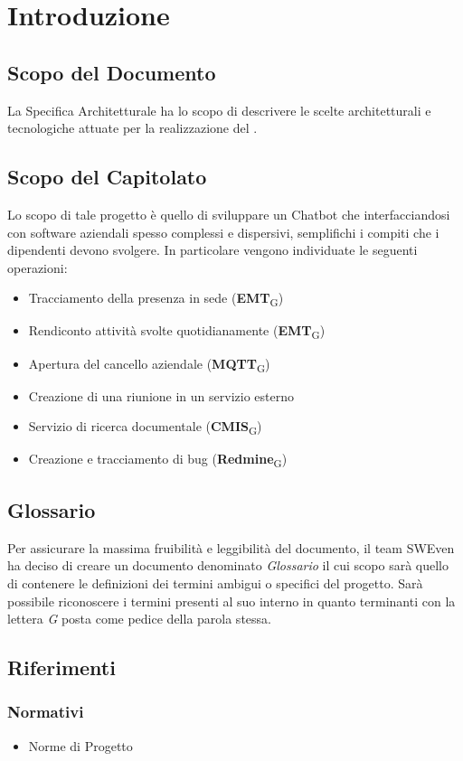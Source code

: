 \section{Introduzione}
\subsection{Scopo del Documento}
La Specifica Architetturale ha lo scopo di descrivere le scelte architetturali e tecnologiche attuate per la realizzazione del .

\subsection{Scopo del Capitolato}
Lo scopo di tale progetto è quello di sviluppare un Chatbot che interfacciandosi con software aziendali spesso complessi e dispersivi, semplifichi i compiti che i dipendenti devono svolgere. In particolare vengono individuate le seguenti operazioni: 
\begin{itemize}
	\item Tracciamento della presenza in sede (\textbf{EMT}\textsubscript{G})
	\item Rendiconto attività svolte quotidianamente (\textbf{EMT}\textsubscript{G})
	\item Apertura del cancello aziendale (\textbf{MQTT}\textsubscript{G})
	\item Creazione di una riunione in un servizio esterno
	\item Servizio di ricerca documentale (\textbf{CMIS}\textsubscript{G})
	\item Creazione e tracciamento di bug (\textbf{Redmine}\textsubscript{G})
\end{itemize}

\subsection{Glossario}
Per assicurare la massima fruibilità e leggibilità del documento, il team SWEven ha deciso di creare un documento denominato \textit{Glossario} il cui scopo sarà quello di contenere le definizioni dei termini ambigui o specifici del progetto. Sarà possibile riconoscere i termini presenti al suo interno in quanto terminanti con la lettera \textit{G} posta come pedice della parola stessa. 
\subsection{Riferimenti}
\subsubsection{Normativi}
\begin{itemize}
    \item Norme di Progetto \docVersionNdP
\end{itemize}
